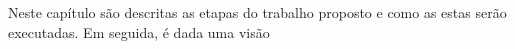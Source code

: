 \begin{comment}
\noindent{\bf Etapa 4:} essa etapa é destinada o projeto e construção de um sistema embarcado microcontrolado para realização das funções do quadricóptero. O sistema deve ser capaz de realizar todas as tarefas em tempo real e de forma autônoma. Suas tarefas incluem: leitura dos sensores, comunicação, execução do sistema de controle de estabilidade e acionamento dos motores. Pode ser escolhido um sistema comercial, desde que atenda ao requisitos e que ofereça total acesso ao microcontrolador, ou pode ser desenvolvido um.


\noindent{\bf Etapa 5:} nessa fase deverá ser projetado e implementado um sistema de controle de estabilidade e desvio de obstáculos. Diversas técnicas de controle já foram analisadas em outros projetos, cada uma apresentando vantagens e desvantagens, de acordo com as características do ambiente de estudo. Com base nesses trabalhos deverão ser escolhidas uma ou mais técnicas para utilização. Baseado na modelagem matemática desenvolvida na etapa 2, softwares matemáticos poderão ser utilizados para auxiliar no projeto do controlador, realizando simulações do funcionamento do sistema antes da implementação no sistema embarcado. Testes reais deverão ser realizados.

\noindent{\bf Etapa 6:} por fim, deverão ser conduzidos testes para verificar o funcionamento completo do veículo e validar os objetivos deste projeto.
\end{comment}





Neste capítulo são descritas as etapas do trabalho proposto e como as estas serão executadas. Em seguida, é dada uma visão 





















